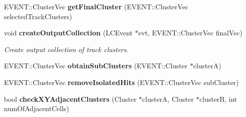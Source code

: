 \begin{DoxyCompactItemize}
\item 
E\-V\-E\-N\-T\-::\-Cluster\-Vec {\bfseries get\-Final\-Cluster} (E\-V\-E\-N\-T\-::\-Cluster\-Vec selected\-Track\-Clusters)\label{classCALICE_1_1AngleTrackFinder_af37cc1b4e139645ca4578d224f019fd3}

\item 
void {\bf create\-Output\-Collection} (L\-C\-Event $\ast$evt, E\-V\-E\-N\-T\-::\-Cluster\-Vec final\-Vec)
\begin{DoxyCompactList}\small\item\em Create output collection of track clusters. \end{DoxyCompactList}\item 
E\-V\-E\-N\-T\-::\-Cluster\-Vec {\bfseries obtain\-Sub\-Clusters} (E\-V\-E\-N\-T\-::\-Cluster $\ast$cluster\-A)\label{classCALICE_1_1AngleTrackFinder_add0057082ccc0bcea73c30d9926fe317}

\item 
E\-V\-E\-N\-T\-::\-Cluster\-Vec {\bfseries remove\-Isolated\-Hits} (E\-V\-E\-N\-T\-::\-Cluster\-Vec sub\-Cluster)\label{classCALICE_1_1AngleTrackFinder_a1af99dd0d0e7dc58b6a1348a5d3729fd}

\item 
bool {\bfseries check\-X\-Y\-Adjacent\-Clusters} (Cluster $\ast$cluster\-A, Cluster $\ast$cluster\-B, int num\-Of\-Adjacent\-Cells)\label{classCALICE_1_1AngleTrackFinder_a1786792116034051608781193e344134}

\end{DoxyCompactItemize}
